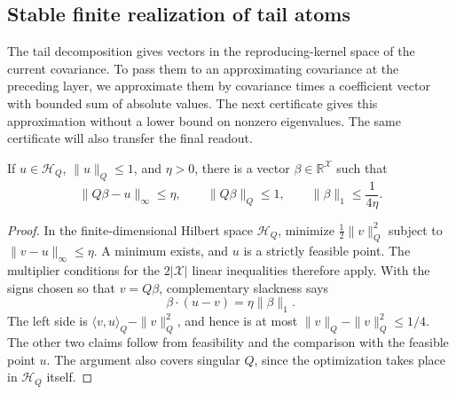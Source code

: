 \subsection{Stable finite realization of tail atoms}
The tail decomposition gives vectors in the reproducing-kernel space of
the current covariance. To pass them to an approximating covariance at
the preceding layer, we approximate them by covariance times a coefficient
vector with bounded sum of absolute values. The next certificate gives
this approximation without a lower bound on nonzero eigenvalues. The
same certificate will also transfer the final readout.

\begin{lemma}
\label{lem:rkhs-atom-certificate}
If $u\in\mathcal H_Q$, $\|u\|_Q\le1$, and $\eta>0$, there is a vector
$\beta\in\mathbb R^{\mathcal X}$ such that
\[
 \|Q\beta-u\|_\infty\le\eta,\qquad
 \|Q\beta\|_Q\le1,\qquad \|\beta\|_1\le\frac1{4\eta}.
\]
\end{lemma}
\begin{proof}
In the finite-dimensional Hilbert space $\mathcal H_Q$, minimize
$\tfrac12\|v\|_Q^2$ subject to $\|v-u\|_\infty\le\eta$.
A minimum exists, and $u$ is a strictly feasible point. The multiplier
conditions for the $2|\mathcal X|$ linear inequalities therefore apply.
With the signs chosen so that $v=Q\beta$, complementary slackness says
\[
 \beta\cdot(u-v)=\eta\|\beta\|_1.
\]
The left side is $\langle v,u\rangle_Q-\|v\|_Q^2$, and hence is at
most $\|v\|_Q-\|v\|_Q^2\le1/4$. The other two claims follow from
feasibility and the comparison with the feasible point $u$.
The argument also covers singular $Q$, since the optimization takes place
in $\mathcal H_Q$ itself.
\end{proof}

